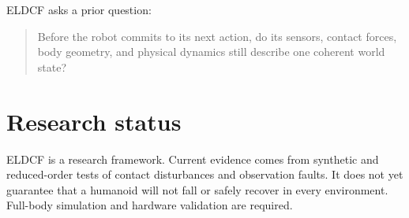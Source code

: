 \documentclass[11pt]{article}
\begin{document}
ELDCF asks a prior question:

\begin{quote}
Before the robot commits to its next action, do its sensors, contact forces, body geometry, and physical dynamics still describe one coherent world state?
\end{quote}

\section{Research status}

ELDCF is a research framework. Current evidence comes from synthetic and reduced-order tests of contact disturbances and observation faults. It does not yet guarantee that a humanoid will not fall or safely recover in every environment. Full-body simulation and hardware validation are required.
\end{document}
